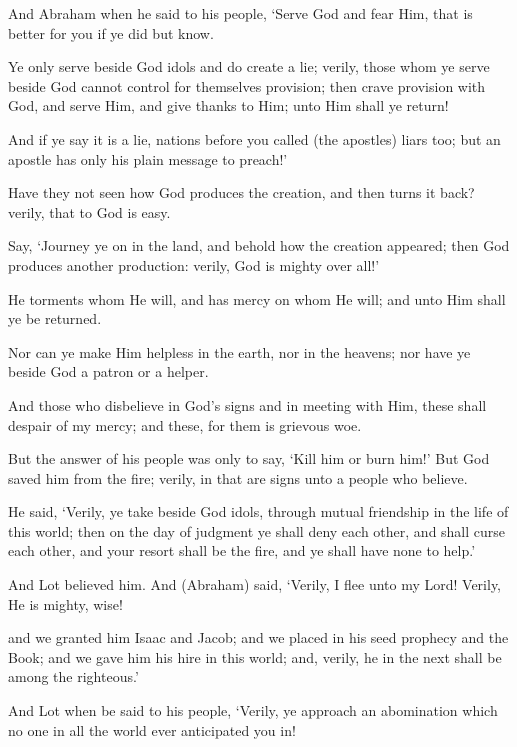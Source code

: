 \documentclass[fontsize=14pt, letterpaper, notitlepage, openany, DIV=12]{scrbook} %
\begin{document}
\noindent[29:16]
And Abraham when he said to his people, `Serve God and fear Him, that is better for you
if ye did but know.

\noindent[29:17]
Ye only serve beside God idols and do create a lie; verily, those whom ye serve beside
God cannot control for themselves provision; then crave provision with God, and serve Him, and
give thanks to Him; unto Him shall ye return!

\noindent[29:18]
And if ye say it is a lie, nations before you called (the apostles) liars too; but an apostle
has only his plain message to preach!'

\noindent[29:19]
Have they not seen how God produces the creation, and then turns it back? verily, that to
God is easy.

\noindent[29:20]
Say, `Journey ye on in the land, and behold how the creation appeared; then God
produces another production: verily, God is mighty over all!'

\noindent[29:21]
He torments whom He will, and has mercy on whom He will; and unto Him shall ye be
returned.

\noindent[29:22]
Nor can ye make Him helpless in the earth, nor in the heavens; nor have ye beside God a
patron or a helper.

\noindent[29:23]
And those who disbelieve in God's signs and in meeting with Him, these shall despair of
my mercy; and these, for them is grievous woe.

\noindent[29:24]
But the answer of his people was only to say, `Kill him or burn him!' But God saved him
from the fire; verily, in that are signs unto a people who believe.

\noindent[29:25]
He said, `Verily, ye take beside God idols, through mutual friendship in the life of this
world; then on the day of judgment ye shall deny each other, and shall curse each other, and your
resort shall be the fire, and ye shall have none to help.'

\noindent[29:26]
And Lot believed him. And (Abraham) said, `Verily, I flee unto my Lord! Verily, He is
mighty, wise!

\noindent[29:27]
and we granted him Isaac and Jacob; and we placed in his seed prophecy and the Book;
and we gave him his hire in this world; and, verily, he in the next shall be among the righteous.'

\noindent[29:28]
And Lot when be said to his people, `Verily, ye approach an abomination which no one
in all the world ever anticipated you in!
\end{document}
